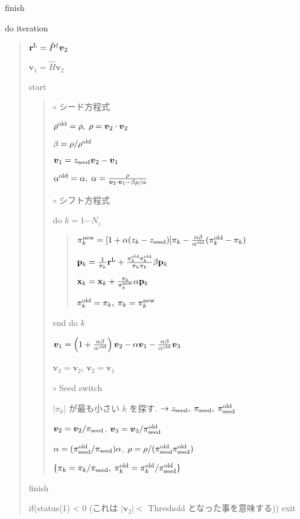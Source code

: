 \documentclass[letterpaper,10pt,dvipdfmx,openany]{sphinxmanual}
\begin{document}
 finish

do iteration
\begin{quote}

\({\bf r}^{\rm L} = {\hat P}^\dagger {\boldsymbol v}_2\)

\({\boldsymbol v}_1 = {\hat H} {\boldsymbol v}_2\)

 start
\begin{quote}

\(\circ\) シード方程式

\(\rho^{\rm old} = \rho,\; \rho = {\boldsymbol v}_2 \cdot {\boldsymbol v}_2\)

\(\beta = \rho / \rho^{\rm old}\)

\({\boldsymbol v}_1 = z_{\rm seed} {\boldsymbol v}_2 - {\boldsymbol v}_1\)

\(\alpha^{\rm old} = \alpha,\; \alpha = \frac{\rho}{{\boldsymbol v}_2 \cdot {\boldsymbol v}_1 - \beta \rho / \alpha }\)

\(\circ\) シフト方程式

do \(k = 1 \cdots N_z\)
\begin{quote}

\(\pi_k^{\rm new} = [1+\alpha(z_k-z_{\rm seed})]\pi_k - \frac{\alpha \beta}{\alpha^{\rm old}}(\pi_k^{\rm old} - \pi_k)\)

\({\bf p}_{k} = \frac{1}{\pi_k} {\bf r}^{\rm L} + \frac{\pi^{\rm old}_k \pi^{\rm old}_k}{\pi_k \pi_k} \beta {\bf p}_{k}\)

\({\bf x}_{k} = {\bf x}_{k} + \frac{\pi_k}{\pi_k^{\rm new}} \alpha {\bf p}_{k}\)

\(\pi_k^{\rm old} = \pi_k,\; \pi_k = \pi_k^{\rm new}\)
\end{quote}

end do \(k\)

\({\boldsymbol v}_1 = \left( 1 + \frac{\alpha \beta}{\alpha^{\rm old}} \right) {\boldsymbol v}_2 - \alpha {\boldsymbol v}_1 - \frac{\alpha \beta}{\alpha^{\rm old}} {\boldsymbol v}_3\)

\({\boldsymbol v}_3 = {\boldsymbol v}_2\),
\({\boldsymbol v}_2 = {\boldsymbol v}_1\)

\(\circ\) Seed switch

\(|\pi_k|\) が最も小さい \(k\) を探す.
\(\rightarrow z_{\rm seed},\; \pi_{\rm seed},\; \pi_{\rm seed}^{\rm old}\)

\({\boldsymbol v}_2 = {\boldsymbol v}_2 / \pi_{\rm seed}\),
\({\boldsymbol v}_3 = {\boldsymbol v}_3 / \pi_{\rm seed}^{\rm old}\)

\(\alpha = (\pi_{\rm seed}^{\rm old} / \pi_{\rm seed}) \alpha\),
\(\rho = \rho / (\pi_{\rm seed}^{\rm old} \pi_{\rm seed}^{\rm old})\)

\(\{\pi_k = \pi_k / \pi_{\rm seed},\; \pi_k^{\rm old} = \pi_k^{\rm old} / \pi_{\rm seed}^{\rm old}\}\)
\end{quote}

 finish

if(status(1) \textless{} 0 (これは \(|{\boldsymbol v}_2| <\) Threshold となった事を意味する)) exit
\end{quote}
\end{document}
